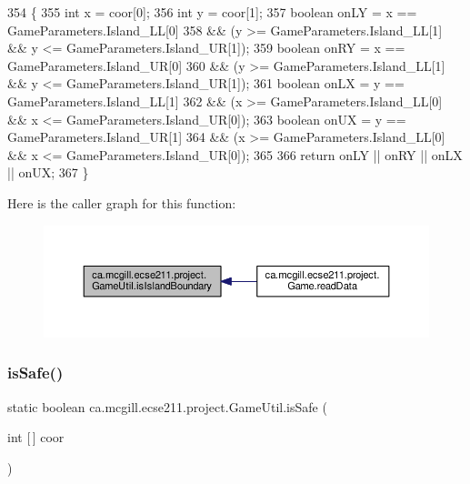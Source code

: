 \begin{DoxyCode}
354                                                      \{
355     \textcolor{keywordtype}{int} x = coor[0];
356     \textcolor{keywordtype}{int} y = coor[1];
357     \textcolor{keywordtype}{boolean} onLY = x == GameParameters.Island\_LL[0]
358         && (y >= GameParameters.Island\_LL[1] && y <= GameParameters.Island\_UR[1]);
359     \textcolor{keywordtype}{boolean} onRY = x == GameParameters.Island\_UR[0]
360         && (y >= GameParameters.Island\_LL[1] && y <= GameParameters.Island\_UR[1]);
361     \textcolor{keywordtype}{boolean} onLX = y == GameParameters.Island\_LL[1]
362         && (x >= GameParameters.Island\_LL[0] && x <= GameParameters.Island\_UR[0]);
363     \textcolor{keywordtype}{boolean} onUX = y == GameParameters.Island\_UR[1]
364         && (x >= GameParameters.Island\_LL[0] && x <= GameParameters.Island\_UR[0]);
365 
366     \textcolor{keywordflow}{return} onLY || onRY || onLX || onUX;
367   \}
\end{DoxyCode}
Here is the caller graph for this function\+:\nopagebreak
\begin{figure}[H]
\begin{center}
\leavevmode
\includegraphics[width=350pt]{classca_1_1mcgill_1_1ecse211_1_1project_1_1_game_util_a5783c3415e13b66362a647504b63741a_icgraph}
\end{center}
\end{figure}
\mbox{\label{classca_1_1mcgill_1_1ecse211_1_1project_1_1_game_util_a4b657445545fb1a814b6699724d72042}} 
\subsubsection{\texorpdfstring{is\+Safe()}{isSafe()}}
{\footnotesize\ttfamily static boolean ca.\+mcgill.\+ecse211.\+project.\+Game\+Util.\+is\+Safe (\begin{DoxyParamCaption}\item[{int \mbox{[}$\,$\mbox{]}}]{coor }\end{DoxyParamCaption})\hspace{0.3cm}{\ttfamily [static]}}

